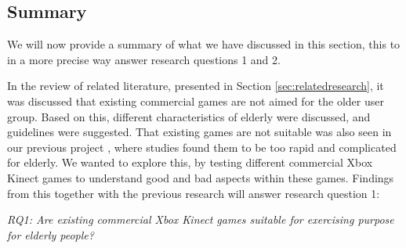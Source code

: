 \subsection{Summary}
We will now provide a summary of what we have discussed in this section, this to in a more precise way answer research questions 1 and 2. 

In the review of related literature, presented in Section \ref{sec:relatedresearch}, it was discussed that existing commercial games are not aimed for the older user group. Based on this, different characteristics of elderly were discussed, and guidelines were suggested. That existing games are not suitable was also seen in our previous project \cite{project}, where studies found them to be too rapid and complicated for elderly. We wanted to explore this, by testing different commercial Xbox Kinect games to understand good and bad aspects within these games. Findings from this together with the previous research will answer research question 1:

\emph{RQ1: Are existing commercial Xbox Kinect games suitable for exercising purpose for elderly people?}

